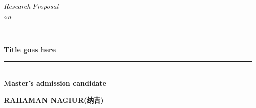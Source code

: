 \documentclass[12pt]{article}
\newcommand{\HRule}{\rule{\linewidth}{1mm}}
\begin{document}
\begin{titlepage}
\begin{center}
    \vspace*{2cm}

    \textit{ Research Proposal \\on}

    \HRule \\[0.3cm]
    { \large \bfseries Title goes here}\\[0.1cm] 
    \HRule \\[0.3cm]


    \large{ \bfseries Master's admission candidate}
    \vspace*{7cm}
    

    \begin{CJK*}{UTF8}{gbsn}
        \large{ \bfseries RAHAMAN NAGIUR(纳吉)}
    \end{CJK*}

    
\end{center}
\end{titlepage}


\newpage









   




\printbibliography
\end{document}
